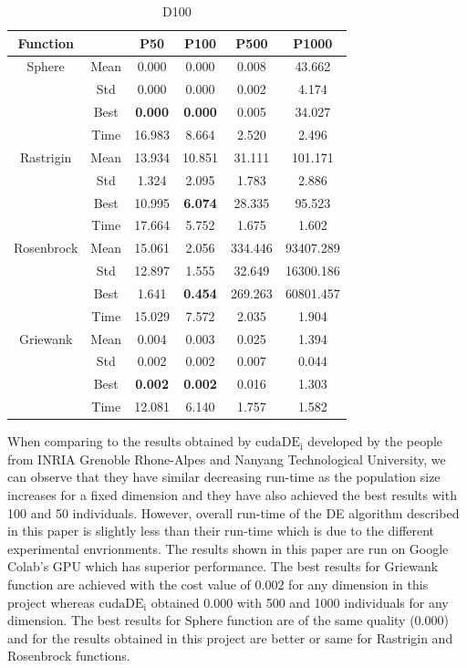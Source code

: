 \documentclass[conference]{IEEEtran}
\begin{document}
\begin{table}[h]
	\centering
	\begin{tabular}{|c|c|c|c|c|c|}
		\hline
		\textbf{Function} & & \textbf{P50} & \textbf{P100} & \textbf{P500} & \textbf{P1000} \\
		\hline
		Sphere 			& Mean & 0.000 & 0.000 & 0.008 & 43.662 \\
						& Std & 0.000 & 0.000 & 0.002 & 4.174 \\
						& Best & \textbf{0.000} & \textbf{0.000} & 0.005 & 34.027 \\
						& Time & 16.983 & 8.664 & 2.520 & 2.496 \\
		\hline
		Rastrigin 		& Mean & 13.934 & 10.851 & 31.111 & 101.171 \\
						& Std & 1.324 & 2.095 & 1.783 & 2.886 \\
						& Best & 10.995 & \textbf{6.074} & 28.335 & 95.523 \\
						& Time & 17.664 & 5.752 & 1.675 & 1.602 \\
		\hline
		Rosenbrock 		& Mean & 15.061 & 2.056 & 334.446 & 93407.289 \\
						& Std & 12.897 & 1.555 & 32.649 & 16300.186 \\
						& Best & 1.641 & \textbf{0.454} & 269.263 & 60801.457 \\
						& Time & 15.029 & 7.572 & 2.035 & 1.904 \\
		\hline
		Griewank 		& Mean & 0.004 & 0.003 & 0.025 & 1.394 \\
						& Std & 0.002 & 0.002 & 0.007 & 0.044 \\
						& Best & \textbf{0.002} & \textbf{0.002} & 0.016 & 1.303 \\
						& Time & 12.081 & 6.140 & 1.757 & 1.582 \\
		\hline
	\end{tabular}
	\caption{D100}
	\label{tab:benchmark3}
\end{table}

When comparing to the results obtained by $\text{cudaDE}_\text{i}$\cite{b4} developed by the people from INRIA Grenoble Rhone-Alpes and Nanyang Technological University, we can observe that they have 
similar decreasing run-time as the population size increases for a fixed dimension and they have also achieved the best results with 100 and 50 individuals. However, overall run-time of the DE algorithm 
described in this paper is slightly less than their run-time which is due to the different experimental envrionments. The results shown in this paper are run on Google Colab's GPU which has superior 
performance. The best results for Griewank function are achieved with the cost value of $0.002$ for any dimension in this project whereas $\text{cudaDE}_\text{i}$ obtained $0.000$ with 500 and 1000 
individuals for any dimension. The best results for Sphere function are of the same quality ($0.000$) and for the results obtained in this project are better or same for Rastrigin and Rosenbrock functions.
\end{document}
